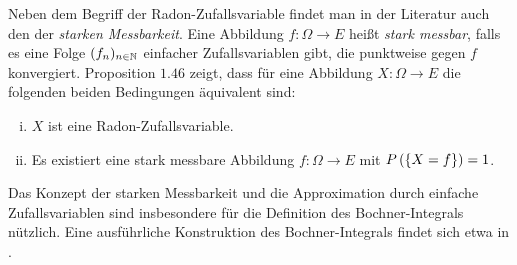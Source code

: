 \begin{remark}
    Neben dem Begriff der Radon-Zufallsvariable findet man in der Literatur auch den der \textit{starken Messbarkeit}.
    Eine Abbildung $f:\Omega \to E$ heißt \textit{stark messbar}, falls es eine Folge $(f_n)_{n \in \mathbb{N}}$ einfacher Zufallsvariablen gibt, die punktweise gegen $f$ konvergiert. 
    Proposition $1.46$ zeigt, dass für eine Abbildung $X: \Omega \to E$ die folgenden beiden Bedingungen äquivalent sind:
    \begin{enumerate}[(i)]
        \item $X$ ist eine Radon-Zufallsvariable. 
        \item Es existiert eine stark messbare Abbildung $f:\Omega \to E$ mit $P\left(\left\{ X=f \right\}\right) = 1$. 
    \end{enumerate}
    Das Konzept der starken Messbarkeit und die Approximation durch einfache Zufallsvariablen sind insbesondere für die Definition des Bochner-Integrals nützlich. 
    Eine ausführliche Konstruktion des Bochner-Integrals findet sich etwa in \cite{van-neerven1}. 
\end{remark}


